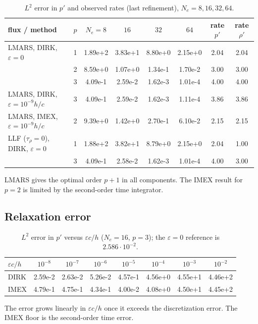 \documentclass[11pt,a4paper]{article}
\begin{document}
\begin{table}[h]\centering
\caption{$L^2$ error in $p'$ and observed rates (last refinement), $N_e=8,16,32,64$.}\label{tab:conv}
\begin{tabular}{llcccccc}\toprule
flux / method & $p$ & $N_e=8$ & $16$ & $32$ & $64$ & rate $p'$ & rate $\rho'$\\\midrule
LMARS, DIRK, $\varepsilon=0$ & 1 & 1.89e+2 & 3.83e+1 & 8.80e+0 & 2.15e+0 & 2.04 & 2.04\\
 & 2 & 8.59e+0 & 1.07e+0 & 1.34e-1 & 1.70e-2 & 3.00 & 3.00\\
 & 3 & 4.09e-1 & 2.59e-2 & 1.62e-3 & 1.01e-4 & 4.00 & 4.00\\
LMARS, DIRK, $\varepsilon=10^{-9}h/c$ & 3 & 4.09e-1 & 2.59e-2 & 1.62e-3 & 1.11e-4 & 3.86 & 3.86\\
LMARS, IMEX, $\varepsilon=10^{-9}h/c$ & 2 & 9.39e+0 & 1.42e+0 & 2.70e-1 & 6.10e-2 & 2.15 & 2.15\\
LLF ($\tau_\rho=0$), DIRK, $\varepsilon=0$ & 1 & 1.88e+2 & 3.82e+1 & 8.79e+0 & 2.15e+0 & 2.04 & 1.00\\
 & 3 & 4.09e-1 & 2.58e-2 & 1.62e-3 & 1.01e-4 & 4.00 & 3.00\\\bottomrule
\end{tabular}
\end{table}
LMARS gives the optimal order $p+1$ in all components. The IMEX result for $p=2$ is limited by
the second-order time integrator.

\subsection{Relaxation error}
\begin{table}[h]\centering
\caption{$L^2$ error in $p'$ versus $\varepsilon c/h$ ($N_e=16$, $p=3$); the $\varepsilon=0$
reference is $2.586\cdot10^{-2}$.}\label{tab:eps}
\begin{tabular}{lccccccc}\toprule
$\varepsilon c/h$ & $10^{-8}$ & $10^{-7}$ & $10^{-6}$ & $10^{-5}$ & $10^{-4}$ & $10^{-3}$ & $10^{-2}$\\\midrule
DIRK & 2.59e-2 & 2.63e-2 & 5.26e-2 & 4.57e-1 & 4.56e+0 & 4.55e+1 & 4.46e+2\\
IMEX & 4.79e-1 & 4.75e-1 & 4.34e-1 & 4.00e-2 & 4.08e+0 & 4.50e+1 & 4.45e+2\\\bottomrule
\end{tabular}
\end{table}
The error grows linearly in $\varepsilon c/h$ once it exceeds the discretization error. The IMEX
floor is the second-order time error.
\end{document}
